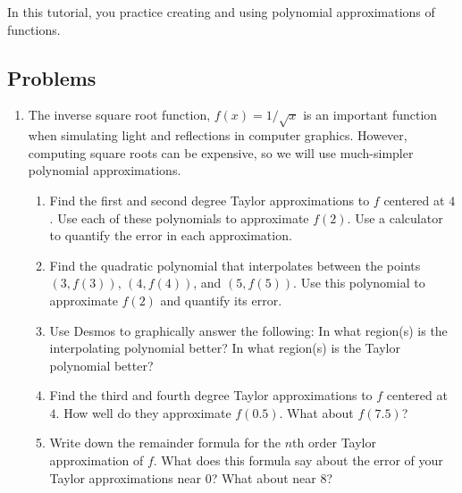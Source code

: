 \begin{objectives}
	In this tutorial, you practice creating and using polynomial approximations of functions.
\end{objectives}



\subsection*{Problems}

\begin{enumerate}
	\item  The inverse square root function, $f(x) = 1/\sqrt{x}$ is an important function
	      when simulating light and reflections in computer graphics.  However, computing square
	      roots can be expensive, so we will use much-simpler polynomial approximations.
	      \begin{enumerate}
		      \item Find the first and second degree Taylor approximations to $f$ centered at $4$.
		            Use each of these polynomials to approximate $f(2)$. Use a calculator
		            to quantify the error in each approximation.
		      \item Find the quadratic polynomial that interpolates between the points
		            $(3,f(3))$, $(4,f(4))$, and $(5,f(5))$.
		            Use this polynomial to approximate $f(2)$ and quantify its error.

		      \item Use Desmos to graphically answer the following:
		            In what region(s) is the interpolating polynomial better?
		            In what region(s) is the Taylor polynomial better?

		      \item Find the third and fourth degree Taylor approximations to $f$ centered at $4$.
		            How well do they approximate $f(0.5)$. What about $f(7.5)$?

		      \item Write down the remainder formula for the $n$th order
		            Taylor approximation of $f$.
		            What does this formula say about the error of your Taylor approximations near $0$?
		            What about near $8$?
	      \end{enumerate}


\end{enumerate}
